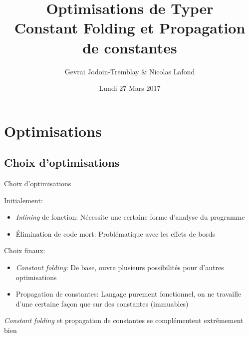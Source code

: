 \documentclass{beamer}
\title[Optimisations Typer]{Optimisations de Typer\\ Constant Folding et Propagation
  de constantes} %
\author{Gevrai Jodoin-Tremblay \& Nicolas Lafond} %
\institute[UDM] %
{
Université de Montréal \\ %
\medskip
}
\date{Lundi 27 Mars 2017} %
\begin{document}
\begin{frame}
\titlepage %
\end{frame}



\section{Optimisations} %
\subsection{Choix d'optimisations} 

\begin{frame}{Choix d'optimisations}

\pause

Initialement: 
  \begin{itemize}
  \item \emph{Inlining} de fonction: Nécessite une certaine forme d'analyse du programme
    \item Élimination de code mort: Problématique avec les effets de bords
  \end{itemize}
 
\pause

Choix finaux:
  \begin{itemize}
    \item \emph{Constant folding}: De base, ouvre plusieurs possibilités pour d'autres optimisations
    \item Propagation de constantes: Langage purement fonctionnel, on ne
      travaille d'une certaine façon que sur des constantes (immuables)
  \end{itemize}

  \emph{Constant folding} et propagation de constantes se complémentent extrêmement bien
\end{frame}
\end{document}
